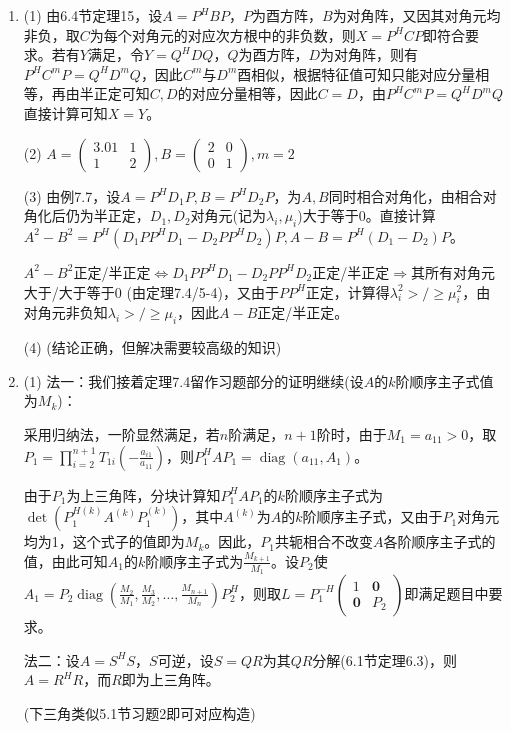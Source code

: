 \documentclass[a4paper,UTF8,fontset=windows]{ctexart}
\DeclareMathOperator{\diag}{diag}
\begin{document}
\begin{enumerate}
\item
(1) 由6.4节定理15，设$A=P^HBP$，$P$为酉方阵，$B$为对角阵，又因其对角元均非负，取$C$为每个对角元的对应次方根中的非负数，则$X=P^HCP$即符合要求。若有$Y$满足，令$Y=Q^HDQ$，$Q$为酉方阵，$D$为对角阵，则有$P^HC^mP=Q^HD^mQ$，因此$C^m$与$D^m$酉相似，根据特征值可知只能对应分量相等，再由半正定可知$C,D$的对应分量相等，因此$C=D$，由$P^HC^mP=Q^HD^mQ$直接计算可知$X=Y$。

(2) $A=\begin{pmatrix}3.01&1\\1&2\end{pmatrix},B=\begin{pmatrix}2&0\\0&1\end{pmatrix},m=2$

(3) 由例7.7，设$A=P^HD_1P,B=P^HD_2P$，为$A,B$同时相合对角化，由相合对角化后仍为半正定，$D_1,D_2$对角元(记为$\lambda_i,\mu_i$)大于等于0。直接计算$A^2-B^2=P^H(D_1PP^HD_1-D_2PP^HD_2)P,A-B=P^H(D_1-D_2)P$。

$A^2-B^2$正定/半正定$\Leftrightarrow D_1PP^HD_1-D_2PP^HD_2$正定/半正定$\Rightarrow$其所有对角元大于/大于等于0 (由定理7.4/5-4)，又由于$PP^H$正定，计算得$\lambda_i^2>/\geq\mu_i^2$，由对角元非负知$\lambda_i>/\geq\mu_i$，因此$A-B$正定/半正定。

(4) (结论正确，但解决需要较高级的知识)

\item
(1) 法一：我们接着定理7.4留作习题部分的证明继续(设$A$的$k$阶顺序主子式值为$M_k$)：

采用归纳法，一阶显然满足，若$n$阶满足，$n+1$阶时，由于$M_1=a_{11}>0$，取$P_1=\prod_{i=2}^{n+1}{T_{1i}\left(-\frac{a_{i1}}{a_{11}}\right)}$，则$P_1^HAP_1=\diag(a_{11},A_1)$。

由于$P_1$为上三角阵，分块计算知$P_1^HAP_1$的$k$阶顺序主子式为$\det(P_1^{H(k)}A^{(k)}P_1^{(k)})$，其中$A^{(k)}$为$A$的$k$阶顺序主子式，又由于$P_1$对角元均为1，这个式子的值即为$M_k$。因此，$P_1$共轭相合不改变$A$各阶顺序主子式的值，由此可知$A_1$的$k$阶顺序主子式为$\frac{M_{k+1}}{M_1}$。设$P_2$使$A_1=P_2\diag\left(\frac{M_2}{M_1},\frac{M_3}{M_2},\ldots,\frac{M_{n+1}}{M_n}\right)P_2^H$，则取$L=P_1^{-H}\begin{pmatrix}1&\mathbf{0}\\\mathbf{0}&P_2\end{pmatrix}$即满足题目中要求。

法二：设$A=S^HS$，$S$可逆，设$S=QR$为其$QR$分解(6.1节定理6.3)，则$A=R^HR$，而$R$即为上三角阵。

(下三角类似5.1节习题2即可对应构造)


\end{enumerate}
\end{document}
